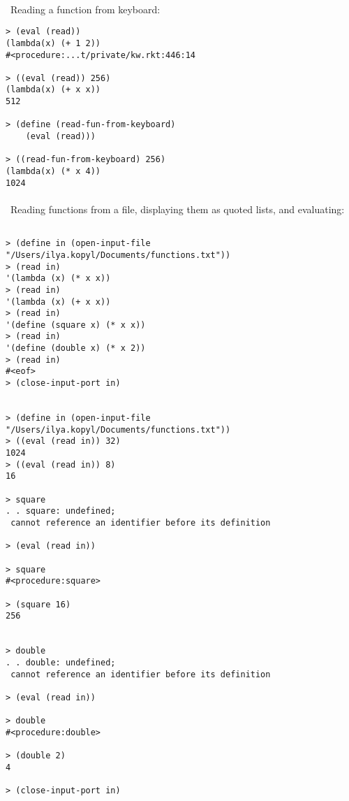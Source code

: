 \documentclass{article}
\begin{document}
\paragraph{}\
Reading a function from keyboard:

\begin{verbatim} 
> (eval (read))
(lambda(x) (+ 1 2))
#<procedure:...t/private/kw.rkt:446:14

> ((eval (read)) 256)
(lambda(x) (+ x x))
512

> (define (read-fun-from-keyboard)
    (eval (read)))

> ((read-fun-from-keyboard) 256)
(lambda(x) (* x 4))
1024
\end{verbatim}
\paragraph{}\
Reading functions from a file, displaying them as quoted lists, and evaluating:

\begin{verbatim} 

> (define in (open-input-file "/Users/ilya.kopyl/Documents/functions.txt"))
> (read in)
'(lambda (x) (* x x))
> (read in)
'(lambda (x) (+ x x))
> (read in)
'(define (square x) (* x x))
> (read in)
'(define (double x) (* x 2))
> (read in)
#<eof>
> (close-input-port in)


> (define in (open-input-file "/Users/ilya.kopyl/Documents/functions.txt"))
> ((eval (read in)) 32)
1024
> ((eval (read in)) 8)
16

> square
. . square: undefined;
 cannot reference an identifier before its definition

> (eval (read in))

> square
#<procedure:square>

> (square 16)
256


> double
. . double: undefined;
 cannot reference an identifier before its definition

> (eval (read in))

> double
#<procedure:double>

> (double 2)
4

> (close-input-port in)
\end{verbatim}
\paragraph{}\
\end{document}
